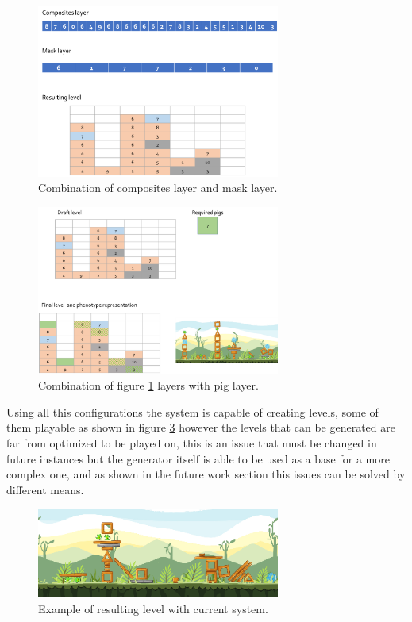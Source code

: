 \documentclass[conference]{IEEEtran}
\begin{document}
    \begin{figure}[htbp]
        \centerline{\includegraphics[width=80mm]{Images/layer12_combine.png}}
        \caption{Combination of composites layer and mask layer.}
        \label{layer12_combine}
    \end{figure}
    
    \begin{figure}[htbp]
        \centerline{\includegraphics[width=80mm]{Images/layer123_combine.png}}
        \caption{Combination of figure \ref{layer12_combine} layers with pig layer.}
        \label{layer123_combine}
    \end{figure}
    
    Using all this configurations the system is capable of creating levels, some of
    them playable as shown in figure \ref{result_1} however the levels that can be
    generated are far from optimized to be played on, this is an issue that must be
    changed in future instances but the generator itself is able to be used as a
    base for a more complex one, and as shown in the future work section this issues
    can be solved by different means.
    
    \begin{figure}[htbp]
        \centerline{\includegraphics[width=80mm]{Images/Result_n2.png}}
        \caption{Example of resulting level with current system.}
        \label{result_1}
    \end{figure}
    
\end{document}
